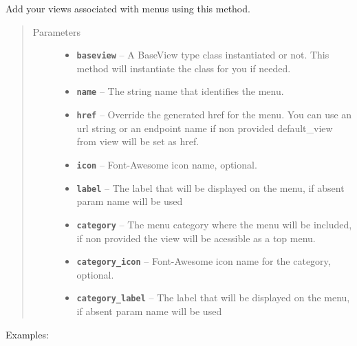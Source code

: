 \documentclass[letterpaper,10pt,english]{sphinxmanual}
\begin{document}
\begin{fulllineitems}
\begin{fulllineitems}
\label{api:flask.ext.appbuilder.base.AppBuilder.add_view}
Add your views associated with menus using this method.
\begin{quote}\begin{description}
\item[{Parameters}] \leavevmode\begin{itemize}
\item {} 
\textbf{\texttt{baseview}} -- A BaseView type class instantiated or not.
This method will instantiate the class for you if needed.

\item {} 
\textbf{\texttt{name}} -- The string name that identifies the menu.

\item {} 
\textbf{\texttt{href}} -- Override the generated href for the menu.
You can use an url string or an endpoint name
if non provided default\_view from view will be set as href.

\item {} 
\textbf{\texttt{icon}} -- Font-Awesome icon name, optional.

\item {} 
\textbf{\texttt{label}} -- The label that will be displayed on the menu,
if absent param name will be used

\item {} 
\textbf{\texttt{category}} -- The menu category where the menu will be included,
if non provided the view will be acessible as a top menu.

\item {} 
\textbf{\texttt{category\_icon}} -- Font-Awesome icon name for the category, optional.

\item {} 
\textbf{\texttt{category\_label}} -- The label that will be displayed on the menu,
if absent param name will be used

\end{itemize}

\end{description}\end{quote}

Examples:


\end{fulllineitems}
\end{fulllineitems}
\end{document}
